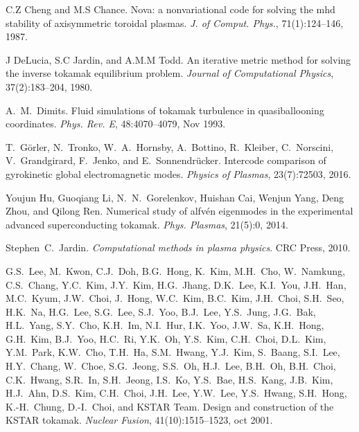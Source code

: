 \documentclass{article}
\newcommand{\tmtextit}[1]{{\itshape{#1}}}
\begin{document}
\begin{thebibliography}{10}
  C.Z Cheng  and  M.S Chance. {\newblock}Nova: a
  nonvariational code for solving the mhd stability of axisymmetric toroidal
  plasmas. {\newblock}\tmtextit{J. of Comput. Phys.}, 71(1):124--146,
  1987.{\newblock}
  
  J DeLucia, S.C Jardin, and  A.M.M Todd.
  {\newblock}An iterative metric method for solving the inverse tokamak
  equilibrium problem. {\newblock}\tmtextit{Journal of Computational Physics},
  37(2):183--204, 1980.{\newblock}
  
  A.~M.~Dimits. {\newblock}Fluid simulations of
  tokamak turbulence in quasiballooning coordinates.
  {\newblock}\tmtextit{Phys. Rev. E}, 48:4070--4079, Nov 1993.{\newblock}
  
  T.~G{\"o}rler, N.~Tronko, W.~A.~Hornsby, A.~Bottino,
  R.~Kleiber, C.~Norscini, V.~Grandgirard, F.~Jenko, and 
  E.~Sonnendr{\"u}cker. {\newblock}Intercode comparison of gyrokinetic global
  electromagnetic modes. {\newblock}\tmtextit{Physics of Plasmas},
  23(7):72503, 2016.{\newblock}
  
  Youjun Hu, Guoqiang Li, N.~N.~Gorelenkov, Huishan Cai,
  Wenjun Yang, Deng Zhou, and  Qilong Ren. {\newblock}Numerical study of
  alfv{\'e}n eigenmodes in the experimental advanced superconducting tokamak.
  {\newblock}\tmtextit{Phys. Plasmas}, 21(5):0, 2014.{\newblock}
  
  Stephen~C.~Jardin.
  {\newblock}\tmtextit{Computational methods in plasma physics}.
  {\newblock}CRC Press, 2010.{\newblock}
  
  G.S.~Lee, M.~Kwon, C.J.~Doh, B.G.~Hong, K.~Kim,
  M.H.~Cho, W.~Namkung, C.S.~Chang, Y.C.~Kim, J.Y.~Kim, H.G.~Jhang, D.K.~Lee,
  K.I.~You, J.H.~Han, M.C.~Kyum, J.W.~Choi, J.~Hong, W.C.~Kim, B.C.~Kim,
  J.H.~Choi, S.H.~Seo, H.K.~Na, H.G.~Lee, S.G.~Lee, S.J.~Yoo, B.J.~Lee,
  Y.S.~Jung, J.G.~Bak, H.L.~Yang, S.Y.~Cho, K.H.~Im, N.I.~Hur, I.K.~Yoo,
  J.W.~Sa, K.H.~Hong, G.H.~Kim, B.J.~Yoo, H.C.~Ri, Y.K.~Oh, Y.S.~Kim,
  C.H.~Choi, D.L.~Kim, Y.M.~Park, K.W.~Cho, T.H.~Ha, S.M.~Hwang, Y.J.~Kim,
  S.~Baang, S.I.~Lee, H.Y.~Chang, W.~Choe, S.G.~Jeong, S.S.~Oh, H.J.~Lee,
  B.H.~Oh, B.H.~Choi, C.K.~Hwang, S.R.~In, S.H.~Jeong, I.S.~Ko, Y.S.~Bae,
  H.S.~Kang, J.B.~Kim, H.J.~Ahn, D.S.~Kim, C.H.~Choi, J.H.~Lee, Y.W.~Lee,
  Y.S.~Hwang, S.H.~Hong, K.-H.~Chung, D.-I.~Choi, and  KSTAR Team.
  {\newblock}Design and construction of the KSTAR tokamak.
  {\newblock}\tmtextit{Nuclear Fusion}, 41(10):1515--1523, oct
  2001.{\newblock}
  

\end{thebibliography}
\end{document}
